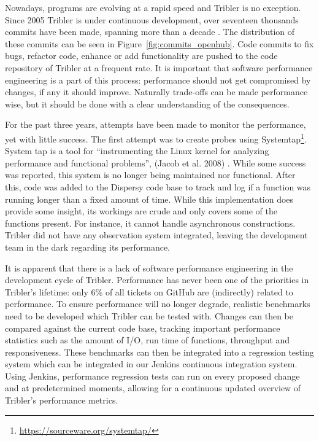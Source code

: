 Nowadays, programs are evolving at a rapid speed and Tribler is no exception. 
Since 2005 Tribler is under continuous development, over seventeen thousands commits have been made, spanning more than a decade \cite{openhub2016tribler}.
The distribution of these commits can be seen in Figure~\ref{fig:commits_openhub}.
Code commits to fix bugs, refactor code, enhance or add functionality are pushed to the code repository of Tribler at a frequent rate.
It is important that software performance engineering is a part of this process: performance should not get compromised by changes, if any it should improve.
Naturally trade-offs can be made performance wise, but it should be done with a clear understanding of the consequences.

For the past three years, attempts have been made to monitor the performance, yet with little success.
The first attempt was to create probes using Systemtap\footnote{\url{https://sourceware.org/systemtap/}}.
System tap is a tool for \enquote{instrumenting the Linux kernel for analyzing performance and functional problems}, (Jacob et al. 2008) \cite{jacob2008systemtap}.
While some success was reported, this system is no longer being maintained nor functional.
After this, code was added to the Dispersy code base to track and log if a function was running longer than a fixed amount of time.
While this implementation does provide some insight, its workings are crude and only covers some of the functions present.
For instance, it cannot handle asynchronous constructions.
Tribler did not have any observation system integrated, leaving the development team in the dark regarding its performance.

It is apparent that there is a lack of software performance engineering in the development cycle of Tribler.
Performance has never been one of the priorities in Tribler's lifetime: only 6\% of all tickets on GitHub are (indirectly) related to performance.
To ensure performance will no longer degrade, realistic benchmarks need to be developed which Tribler can be tested with.
Changes can then be compared against the current code base, tracking important performance statistics such as the amount of I/O, run time of functions, throughput and responsiveness.
These benchmarks can then be integrated into a regression testing system which can be integrated in our Jenkins continuous integration system.
Using Jenkins, performance regression tests can run on every proposed change and at predetermined moments, allowing for a continuous updated overview of Tribler's performance metrics.

